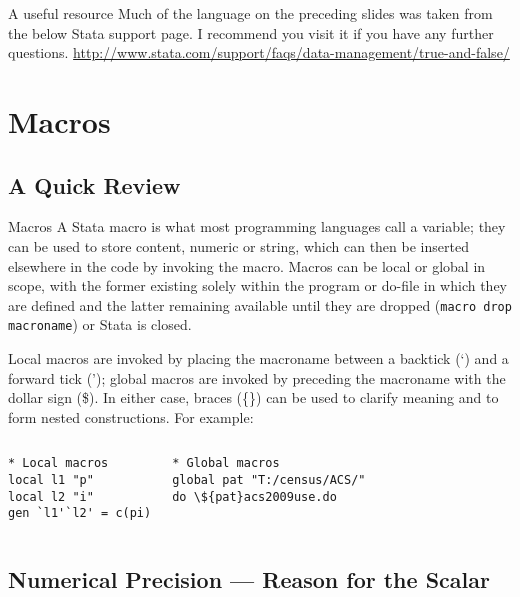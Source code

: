 \documentclass[fleqn, handout, 10pt]{beamer}
\def\lst{\lstinline}
\begin{document}
\begin{frame}{A useful resource}
    Much of the language on the preceding slides was taken from the below Stata support page. I recommend you visit it if you have any further questions.
    \url{http://www.stata.com/support/faqs/data-management/true-and-false/}
\end{frame}
\section{Macros}

\subsection{A Quick Review}
\begin{frame}[fragile]{Macros}
    A Stata macro is what most programming languages call a variable; they can be used to store content, numeric or string, which can then be inserted elsewhere in the code by invoking the macro. Macros can be local or global in scope, with the former existing solely within the program or do-file in which they are defined and the latter remaining available until they are dropped (\lst=macro drop macroname=) or Stata is closed.

    Local macros are invoked by placing the macroname between a backtick (`) and a forward tick ('); global macros are invoked by preceding the macroname with the dollar sign (\$). In either case, braces (\{\}) can be used to clarify meaning and to form nested constructions. For example:

    \begin{columns}[t]
    \centering
	    \begin{lstlisting}
* Local macros
local l1 "p"
local l2 "i"
gen `l1'`l2' = c(pi)
	    \end{lstlisting}
	    \begin{lstlisting}
* Global macros
global pat "T:/census/ACS/"
do \${pat}acs2009use.do
	    \end{lstlisting}
    \end{columns}
\end{frame}

\subsection{Numerical Precision --- Reason for the Scalar}
\end{document}
